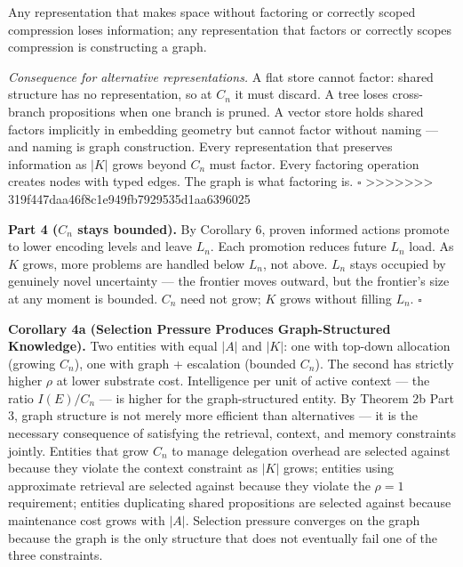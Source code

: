 \documentclass[
]{article}
\begin{document}
Any representation that makes space without factoring or correctly
scoped compression loses information; any representation that factors or
correctly scopes compression is constructing a graph.

\emph{Consequence for alternative representations.} A flat store cannot
factor: shared structure has no representation, so at \(C_n\) it must
discard. A tree loses cross-branch propositions when one branch is
pruned. A vector store holds shared factors implicitly in embedding
geometry but cannot factor without naming --- and naming is graph
construction. Every representation that preserves information as
\(|K|\) grows beyond \(C_n\) must factor. Every factoring operation
creates nodes with typed edges. The graph is what factoring is.
\(\square\)
>>>>>>> 319f447daa46f8c1e949fb7929535d1aa6396025

\textbf{Part 4 (\(C_n\) stays bounded).} By Corollary 6, proven informed
actions promote to lower encoding levels and leave \(L_n\). Each
promotion reduces future \(L_n\) load. As \(K\) grows, more problems are
handled below \(L_n\), not above. \(L_n\) stays occupied by genuinely
novel uncertainty --- the frontier moves outward, but the frontier's
size at any moment is bounded. \(C_n\) need not grow; \(K\) grows
without filling \(L_n\). \(\square\)

\textbf{Corollary 4a (Selection Pressure Produces Graph-Structured
Knowledge).} Two entities with equal \(|A|\) and \(|K|\): one with
top-down allocation (growing \(C_n\)), one with graph + escalation
(bounded \(C_n\)). The second has strictly higher \(\rho\) at lower
substrate cost. Intelligence per unit of active context --- the ratio
\(I(E)/C_n\) --- is higher for the graph-structured entity. By Theorem
2b Part 3, graph structure is not merely more efficient than
alternatives --- it is the necessary consequence of satisfying the
retrieval, context, and memory constraints jointly. Entities that grow
\(C_n\) to manage delegation overhead are selected against because they
violate the context constraint as \(|K|\) grows; entities using
approximate retrieval are selected against because they violate the
\(\rho = 1\) requirement; entities duplicating shared propositions are
selected against because maintenance cost grows with \(|A|\). Selection
pressure converges on the graph because the graph is the only structure
that does not eventually fail one of the three constraints.
\end{document}
